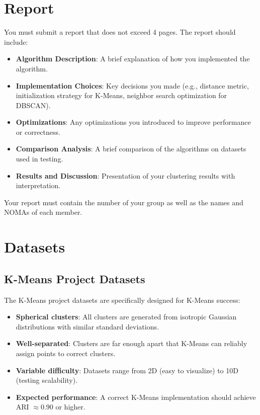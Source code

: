 \documentclass[]{article}
\begin{document}
	
	\section{Report}
	
	You must submit a report that does not exceed 4 pages. The report should include:
	
	\begin{itemize}
		\item \textbf{Algorithm Description}: A brief explanation of how you implemented the algorithm.
		\item \textbf{Implementation Choices}: Key decisions you made (e.g., distance metric, initialization strategy for K-Means, neighbor search optimization for DBSCAN).
		\item \textbf{Optimizations}: Any optimizations you introduced to improve performance or correctness.
		\item \textbf{Comparison Analysis}: A brief comparison of the algorithms on datasets used in testing.
		\item \textbf{Results and Discussion}: Presentation of your clustering results with interpretation.
	\end{itemize}
	
	Your report must contain the number of your group as well as the names and NOMAs of each member.
	
	\section{Datasets}
	
	\subsection{K-Means Project Datasets}
	
	The K-Means project datasets are specifically designed for K-Means success:
	
	\begin{itemize}
		\item \textbf{Spherical clusters}: All clusters are generated from isotropic Gaussian distributions with similar standard deviations.
		\item \textbf{Well-separated}: Clusters are far enough apart that K-Means can reliably assign points to correct clusters.
		\item \textbf{Variable difficulty}: Datasets range from 2D (easy to visualize) to 10D (testing scalability).
		\item \textbf{Expected performance}: A correct K-Means implementation should achieve ARI $\approx 0.90$ or higher.
	\end{itemize}
	
\end{document}

